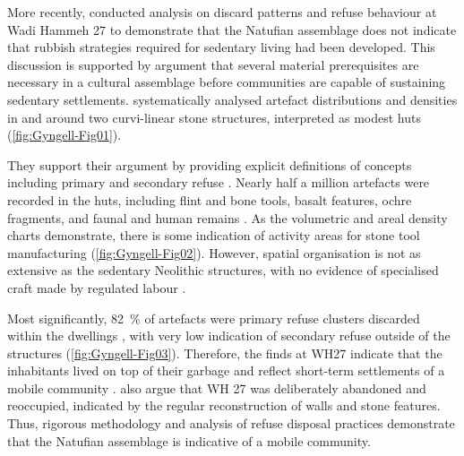 More recently, \textcite{Hardy-Smith_2004} conducted analysis on discard patterns and refuse behaviour at Wadi Hammeh 27 to demonstrate that the Natufian assemblage does not indicate that rubbish strategies required for sedentary living had been developed. 
This discussion is supported by \textcite{Fletcher_2007} argument that several material prerequisites are necessary in a cultural assemblage before communities are capable of sustaining sedentary settlements. 
\textcite[253]{Hardy-Smith_2004} systematically analysed artefact distributions and densities in and around two curvi-linear stone structures, interpreted as modest huts (\cref{fig:Gyngell-Fig01}).

They support their argument by providing explicit definitions of concepts including primary and secondary refuse \parencite[255]{Hardy-Smith_2004}. 
Nearly half a million artefacts were recorded in the huts, including flint and bone tools, basalt features, ochre fragments, and faunal and human remains \parencite[279]{Hardy-Smith_2004}. 
As the volumetric and areal density charts demonstrate, there is some indication of activity areas for stone tool manufacturing (\cref{fig:Gyngell-Fig02}). However, spatial organisation is not as extensive as the sedentary Neolithic structures, with no evidence of specialised craft made by regulated labour \parencite[282]{Hardy-Smith_2004}. 


Most significantly, \SI{82}{\percent} of artefacts were primary refuse clusters discarded within the dwellings \parencite[279]{Hardy-Smith_2004}, with very low indication of secondary refuse outside of the structures (\cref{fig:Gyngell-Fig03}). 
Therefore, the finds at WH27 indicate that the inhabitants lived on top of their garbage and reflect short-term settlements of a mobile community \parencite[285]{Hardy-Smith_2004}. 
\textcite[259]{Hardy-Smith_2004} also argue that WH 27 was deliberately abandoned and reoccupied, indicated by the regular reconstruction of walls and stone features. Thus, rigorous methodology and analysis of refuse disposal practices demonstrate that the Natufian assemblage is indicative of a mobile community.



